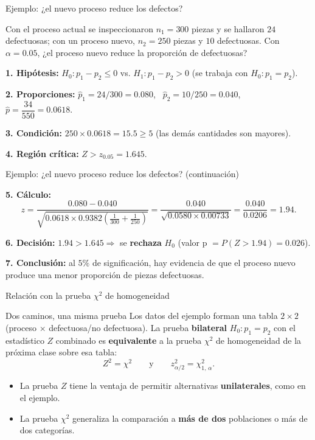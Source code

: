 \documentclass[aspectratio=169,11pt]{beamer}
\begin{document}
\begin{frame}{Ejemplo: ¿el nuevo proceso reduce los defectos?}
\begin{example}
Con el proceso actual se inspeccionaron $n_1=300$ piezas y se hallaron $24$ defectuosas; con un proceso nuevo, $n_2=250$ piezas y $10$ defectuosas. Con $\alpha=0.05$, ¿el proceso nuevo reduce la proporción de defectuosas?

\textbf{1. Hipótesis:} $H_0:p_1-p_2\le0$ vs. $H_1:p_1-p_2>0$ (se trabaja con $H_0:p_1=p_2$).

\textbf{2. Proporciones:} $\hat p_1=24/300=0.080$, \ $\hat p_2=10/250=0.040$, \ $\hat p=\dfrac{34}{550}=0.0618$.

\textbf{3. Condición:} $250\times0.0618=15.5\ge5$ (las demás cantidades son mayores).

\textbf{4. Región crítica:} $Z>z_{0.05}=1.645$.
\end{example}
\end{frame}

\begin{frame}{Ejemplo: ¿el nuevo proceso reduce los defectos? (continuación)}
\begin{example}
\textbf{5. Cálculo:}
\[
z=\frac{0.080-0.040}{\sqrt{0.0618\times0.9382\left(\tfrac{1}{300}+\tfrac{1}{250}\right)}}=\frac{0.040}{\sqrt{0.0580\times0.00733}}=\frac{0.040}{0.0206}=1.94.
\]

\textbf{6. Decisión:} $1.94>1.645\Rightarrow$ se \textbf{rechaza} $H_0$ (valor p $=P(Z>1.94)=0.026$).

\textbf{7. Conclusión:} al $5\%$ de significación, hay evidencia de que el proceso nuevo produce una menor proporción de piezas defectuosas.
\end{example}
\end{frame}

\begin{frame}{Relación con la prueba $\chi^2$ de homogeneidad}
\begin{block}{Dos caminos, una misma prueba}
Los datos del ejemplo forman una tabla $2\times2$ (proceso $\times$ defectuosa/no defectuosa). La prueba \textbf{bilateral} $H_0:p_1=p_2$ con el estadístico $Z$ combinado es \textbf{equivalente} a la prueba $\chi^2$ de homogeneidad de la próxima clase sobre esa tabla:
\[
Z^2=\chi^2 \qquad \text{y} \qquad z_{\alpha/2}^2=\chi^2_{1,\,\alpha}.
\]
\end{block}
\begin{itemize}
\item La prueba $Z$ tiene la ventaja de permitir alternativas \textbf{unilaterales}, como en el ejemplo.
\item La prueba $\chi^2$ generaliza la comparación a \textbf{más de dos} poblaciones o más de dos categorías.
\end{itemize}
\end{frame}
\end{document}
